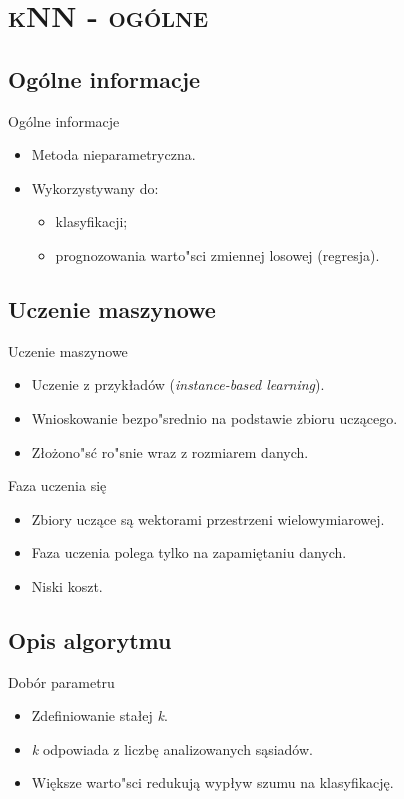 \section{\scshape kNN - ogólne}

\subsection{Ogólne informacje}
\begin{frame}{Ogólne informacje}
\begin{itemize}
	\item Metoda nieparametryczna.
	\item Wykorzystywany do:
	\begin{itemize}
		\item klasyfikacji;
		\item prognozowania warto"sci zmiennej losowej (regresja).
	\end{itemize}
\end{itemize}
\end{frame}

\subsection{Uczenie maszynowe}
\begin{frame}{Uczenie maszynowe}
\begin{itemize}
	\item Uczenie z przykładów (\emph{instance-based learning}).
	\item Wnioskowanie bezpo"srednio na podstawie zbioru uczącego.
	\item Złożono"sć ro"snie wraz z rozmiarem danych.
\end{itemize}
\end{frame}

\begin{frame}{Faza uczenia się}
\begin{itemize}
	\item Zbiory uczące są wektorami przestrzeni wielowymiarowej.
	\item Faza uczenia polega tylko na zapamiętaniu danych.
	\item Niski koszt.
\end{itemize}
\end{frame}

\subsection{Opis algorytmu}
\begin{frame}{Dobór parametru}
\begin{itemize}
	\item Zdefiniowanie stałej \emph{k}.
	\item \emph{k} odpowiada z liczbę analizowanych sąsiadów.
	\item Większe warto"sci redukują wypływ szumu na klasyfikację.
\end{itemize}
\end{frame}

